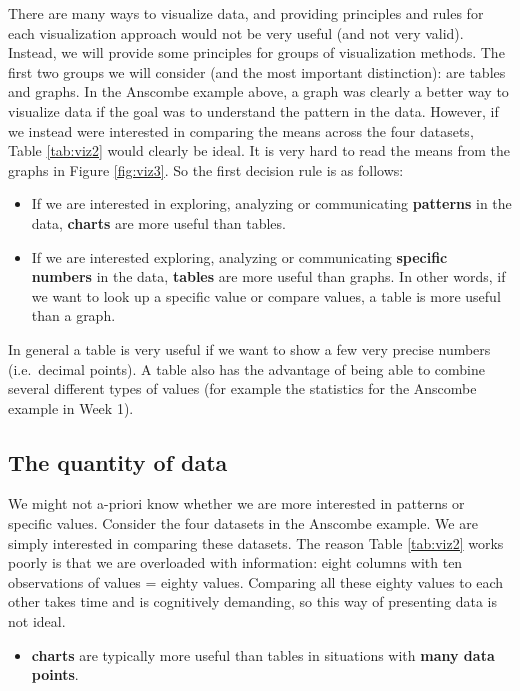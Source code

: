 \documentclass[
]{book}
\providecommand{\tightlist}{%
  \setlength{\itemsep}{0pt}\setlength{\parskip}{0pt}}
\begin{document}
There are many ways to visualize data, and providing principles and rules for each visualization approach would not be very useful (and not very valid). Instead, we will provide some principles for groups of visualization methods. The first two groups we will consider (and the most important distinction): are tables and graphs. In the Anscombe example above, a graph was clearly a better way to visualize data if the goal was to understand the pattern in the data. However, if we instead were interested in comparing the means across the four datasets, Table \ref{tab:viz2} would clearly be ideal. It is very hard to read the means from the graphs in Figure \ref{fig:viz3}. So the first decision rule is as follows:

\begin{itemize}
\tightlist
\item
  If we are interested in exploring, analyzing or communicating \textbf{patterns} in the data, \textbf{charts} are more useful than tables.
\item
  If we are interested exploring, analyzing or communicating \textbf{specific numbers} in the data, \textbf{tables} are more useful than graphs. In other words, if we want to look up a specific value or compare values, a table is more useful than a graph.
\end{itemize}

In general a table is very useful if we want to show a few very precise numbers (i.e.~decimal points). A table also has the advantage of being able to combine several different types of values (for example the statistics for the Anscombe example in Week 1).

\hypertarget{the-quantity-of-data}{%
\subsection*{The quantity of data}\label{the-quantity-of-data}}

We might not a-priori know whether we are more interested in patterns or specific values. Consider the four datasets in the Anscombe example. We are simply interested in comparing these datasets. The reason Table \ref{tab:viz2} works poorly is that we are overloaded with information: eight columns with ten observations of values = eighty values. Comparing all these eighty values to each other takes time and is cognitively demanding, so this way of presenting data is not ideal.

\begin{itemize}
\tightlist
\item
  \textbf{charts} are typically more useful than tables in situations with \textbf{many data points}.
\end{itemize}
\end{document}
